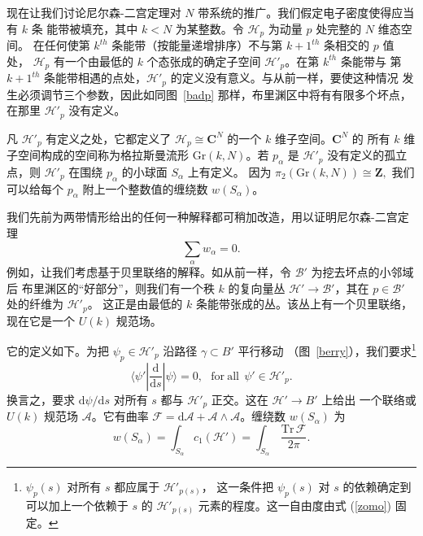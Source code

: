 \documentclass[11pt,a4paper]{article}
\numberwithin{equation}{section}
\def\Tr{{\mathrm{Tr}}}
\def\B{\mathcal B}
\def\Z{\mathbf Z}
\def\d{{\mathrm d}}
\def\F{\mathcal F}
\def\C{\mathbf C}
\def\Gr{\mathrm{Gr}}
\def\A{\mathcal A}
\def\be{\begin{equation}}
\def\ee{\end{equation}}
\def\H{\mathcal H}
\begin{document}
现在让我们讨论尼尔森-二宫定理对 $N$ 带系统的推广。我们假定电子密度使得应当有 $k$ 条
能带被填充，其中 $k<N$ 为某整数。令 $\H_p$ 为动量 $p$ 处完整的 $N$ 维态空间。
在任何使第 $k^{th}$ 条能带（按能量递增排序）不与第 $k+1^{th}$ 条相交的 $p$ 值处，
$\H_p$ 有一个由最低的 $k$ 个态张成的确定子空间 $\H'_p$。在第 $k^{th}$ 条能带与
第 $k+1^{th}$ 条能带相遇的点处，$\H'_p$ 的定义没有意义。与从前一样，要使这种情况
发生必须调节三个参数，因此如同图~\ref{badp} 那样，布里渊区中将有有限多个坏点，
在那里 $\H'_p$ 没有定义。

凡 $\H'_p$ 有定义之处，它都定义了 $\H_p\cong \C^N$ 的一个 $k$ 维子空间。$\C^N$ 的
所有 $k$ 维子空间构成的空间称为格拉斯曼流形 $\Gr(k,N)$。若 $p_\alpha$ 是 $\H'_p$
没有定义的孤立点，则 $\H'_p$ 在围绕 $p_\alpha$ 的小球面 $S_\alpha$ 上有定义。
因为
$\pi_2(\Gr(k,N))\cong \Z,$
我们可以给每个 $p_\alpha$ 附上一个整数值的缠绕数 $w(S_\alpha)$。

我们先前为两带情形给出的任何一种解释都可稍加改造，用以证明尼尔森-二宫定理
\begin{equation}\label{npn}\sum_\alpha w_\alpha=0.\end{equation}
例如，让我们考虑基于贝里联络的解释。如从前一样，令 $\B'$ 为挖去坏点的小邻域后
布里渊区的“好部分”，则我们有一个秩 $k$ 的复向量丛 $\H'\to 
\B'$，其在 $p\in 
\B'$ 处的纤维为 $\H'_p$。
这正是由最低的 $k$ 条能带张成的丛。该丛上有一个贝里联络，现在它是一个 $U(k)$
规范场。

它的定义如下。为把 $\psi_p\in \H'_p$ 沿路径 $\gamma \subset B'$ 平行移动
（图~\ref{berry}），我们要求\footnote{$\psi_p(s)$ 对所有 $s$ 都应属于 $\H'_{p(s)}$，
这一条件把 $\psi_p(s)$ 对 $s$ 的依赖确定到可以加上一个依赖于 $s$ 的 $\H'_{p(s)}$
元素的程度。这一自由度由式 (\ref{zomo}) 固定。}
\be\label{zomo}\langle \psi'|\frac{\d}{\d s}|\psi\rangle=0,~~~{\mathrm{for~all}}~~\psi'\in\H'_p.\ee 
换言之，要求 $\d\psi/\d s$ 对所有 $s$ 都与 $\H'_p$ 正交。这在 $\H'\to B'$ 上给出
一个联络或 $U(k)$ 规范场 $\A$。它有曲率 $\F=\d\A+\A\wedge \A$。缠绕数
$w(S_\alpha)$ 为
$$w(S_\alpha)=\int_{S_\alpha}c_1(\H')=\int_{S_\alpha} \,\frac{\Tr\, \F}{2\pi}.$$  
\end{document}
